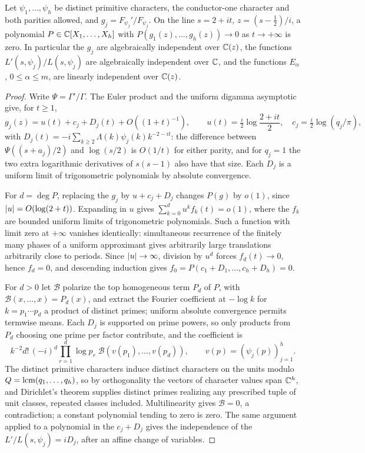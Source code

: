 \begin{lemma}\label{zer:lem:algindep}
Let $\psi_1,\dots,\psi_h$ be distinct primitive characters, the conductor-one character and both parities
allowed, and $g_j=F_{\psi_j}'/F_{\psi_j}$. On the line $s=2+it$, $z=(s-\tfrac12)/i$, a polynomial
$P\in\mathbb{C}[X_1,\dots,X_h]$ with $P(g_1(z),\dots,g_h(z))\to0$ as $t\to+\infty$ is zero. In particular the
$g_j$ are algebraically independent over $\mathbb{C}(z)$, the functions $L'(s,\psi_j)/L(s,\psi_j)$ are
algebraically independent over $\mathbb{C}$, and the functions $E_\alpha$, $0\le\alpha\le m$, are linearly
independent over $\mathbb{C}(z)$.
\end{lemma}
\begin{proof}
Write $\Psi=\Gamma'/\Gamma$. The Euler product and the uniform digamma asymptotic give, for $t\ge1$,
\[
 g_j(z)=u(t)+c_j+D_j(t)+O((1+t)^{-1}),\qquad u(t)=\tfrac i2\log\frac{2+it}2,\quad c_j=\tfrac i2\log(q_j/\pi),
\]
with $D_j(t)=-i\sum_{k\ge2}\Lambda(k)\psi_j(k)k^{-2-it}$: the difference between $\Psi((s+a_j)/2)$ and
$\log(s/2)$ is $O(1/t)$ for either parity, and for $q_j=1$ the two extra logarithmic derivatives of
$s(s-1)$ also have that size. Each $D_j$ is a uniform limit of trigonometric polynomials by absolute
convergence.

For $d=\deg P$, replacing the $g_j$ by $u+c_j+D_j$ changes $P(g)$ by $o(1)$, since $\lvert u\rvert=O(\log(2+t))$.
Expanding in $u$ gives $\sum_{k=0}^du^kf_k(t)=o(1)$, where the $f_k$ are bounded uniform limits of
trigonometric polynomials. Such a function with limit zero at $+\infty$ vanishes identically:
simultaneous recurrence of the finitely many phases of a uniform approximant gives arbitrarily large
translations arbitrarily close to periods. Since $\lvert u\rvert\to\infty$, division by $u^d$ forces
$f_d(t)\to0$, hence $f_d=0$, and descending induction gives $f_0=P(c_1+D_1,\dots,c_h+D_h)=0$.

For $d>0$ let $\mathcal B$ polarize the top homogeneous term $P_d$ of $P$, with
$\mathcal B(x,\dots,x)=P_d(x)$, and extract the Fourier coefficient at $-\log k$ for $k=p_1\cdots p_d$ a
product of distinct primes; uniform absolute convergence permits termwise means. Each $D_j$ is
supported on prime powers, so only products from $P_d$ choosing one prime per factor contribute, and
the coefficient is
\[
 k^{-2}d!\,(-i)^d\prod_{r=1}^d\log p_r\;\mathcal B(v(p_1),\dots,v(p_d)),\qquad v(p)=(\psi_j(p))_{j=1}^h.
\]
The distinct primitive characters induce distinct characters on the units modulo
$Q=\operatorname{lcm}(q_1,\dots,q_h)$, so by orthogonality the vectors of character values span $\mathbb{C}^h$, and Dirichlet's
theorem supplies distinct primes realizing any prescribed tuple of unit classes, repeated classes
included. Multilinearity gives $\mathcal B=0$, a contradiction; a constant polynomial tending to zero is
zero. The same argument applied to a polynomial in the $c_j+D_j$ gives the independence of the
$L'/L(s,\psi_j)=iD_j$, after an affine change of variables.


\end{proof}
